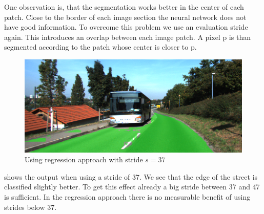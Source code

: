 One observation is, that the segmentation works better in the center of each patch. Close to the border of each image section the neural network does not have good information. To overcome this problem we use an evaluation stride again. This introduces an overlap between each image patch. A pixel p is than segmented according to the patch whose center is closer to p.




\begin{figure}[H]
	\centering
	\includegraphics[width=\columnwidth]{figures/models/testing2-um_32_conv_stride37.png}
	\caption{Using regression approach with stride $s=37$}
	\label{fig:reg_stride37}
\end{figure}

 shows the output when using a stride of 37. We see that the edge of the street is classified slightly better. To get this effect already a big stride between 37 and 47 is sufficient. In the regression approach there is no measurable benefit of using strides below 37.

